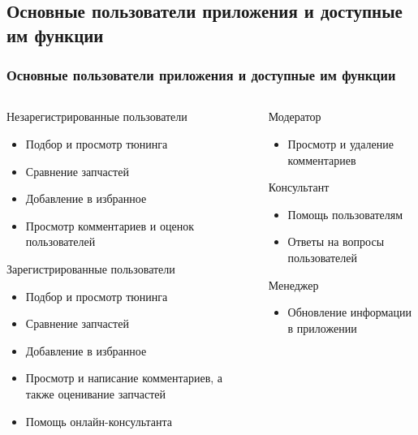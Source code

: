 \documentclass[10pt,utf8,presentation,notheorems,xcolor=dvipsnames,compress]{beamer}
\begin{document}
\subsection{Основные пользователи приложения и доступные им функции}
\begin{frame}
\frametitle{Основные пользователи приложения и доступные им функции}
\vskip -0.55cm
  \begin{columns}[T]
    \begin{column}{.65\textwidth}
     \begin{block}{Незарегистрированные пользователи}
\begin{itemize}
\item Подбор и просмотр тюнинга
\item Сравнение запчастей
\item Добавление в избранное
\item Просмотр комментариев и оценок пользователей
\end{itemize}
    \end{block}
    \vskip -0.15cm
     \begin{block}{Зарегистрированные пользователи}
\begin{itemize}
\item Подбор и просмотр тюнинга
\item Сравнение запчастей
\item Добавление в избранное
\item Просмотр и написание комментариев, а также оценивание запчастей
\item Помощь онлайн-консультанта
\end{itemize}
    \end{block}
    \end{column}
    \begin{column}{.25\textwidth}
         \begin{block}{Модератор}
\begin{itemize}
\item Просмотр и удаление комментариев
\end{itemize}
    \end{block}
    \vskip -0.175cm
         \begin{block}{Консультант}
\begin{itemize}
\item Помощь пользователям
\item Ответы на вопросы пользователей
\end{itemize}
    \end{block}
    \vskip -0.175cm
         \begin{block}{Менеджер}
\begin{itemize}
\item Обновление информации в приложении
\end{itemize}
    \end{block}
        \end{column}
  \end{columns}
\end{frame}
\end{document}
